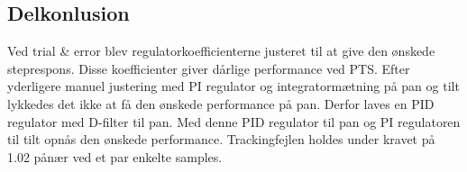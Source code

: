 
\subsection{Delkonlusion}
Ved trial \& error blev regulatorkoefficienterne justeret til at give den ønskede 
steprespons. Disse koefficienter giver dårlige performance ved PTS. 
Efter yderligere manuel justering med PI regulator og integratormætning på pan og tilt lykkedes 
det ikke at få den ønskede performance på pan. 
Derfor laves en PID regulator med D-filter til pan. Med denne PID regulator til pan og 
PI regulatoren til tilt opnås den ønskede performance. 
Trackingfejlen holdes under kravet på 1.02 \degree pånær ved et par enkelte 
samples.

